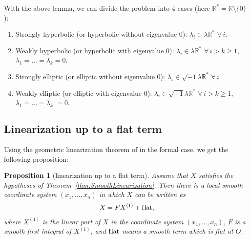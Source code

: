 \documentclass[11pt]{article}
\numberwithin{equation}{section}
\newtheorem{prop}[thm]{Proposition}
 { \theoremstyle{definition}
\newtheorem{Remark}[thm]{Remark} }
\newcommand{\bbR}{\mathbb R}
\begin{document}
With the above lemma, we can divide the problem into 4 cases (here $\bbR^* = \bbR \setminus \{0\}$):
\begin{enumerate}\itemsep=0pt
\item[I.] Strongly hyperbolic (or hyperbolic without eigenvalue 0): $\lambda_i \in \lambda\bbR^*$ $\forall\, i$.
\item[II.] Weakly hyperbolic (or hyperbolic with eigenvalue 0): $\lambda_i \in \lambda\bbR^* $ $\forall\, i > k \geq 1$,
$\lambda_1 = \dots = \lambda_k = 0$.
\item[III.] Strongly elliptic (or elliptic without eigenvalue 0): $\lambda_i \in \sqrt{-1}\lambda\bbR^*$ $\forall\, i$.
\item[IV.] Weakly elliptic (or elliptic with eigenvalue 0): $\lambda_i \in \sqrt{-1}\lambda\bbR^*$ $\forall\, i > k \geq 1$,
$\lambda_1 = \dots = \lambda_k$ $= 0$.
\end{enumerate}

\subsection{Linearization up to a f\/lat term} Using the geometric linearization theorem of \cite{Zung-Nondegenerate2015}
in the formal case, we get the following proposition:

\begin{prop}[linearization up to a f\/lat term] \label{prop:LinearizationUpToFlat}
 Assume that $X$ satisfies the hypotheses of Theorem~{\rm \ref{thm:SmoothLinearization}}. Then there is a local smooth
coordinate system $(x_1,\dots,x_n)$ in which $X$ can be written as
\begin{gather*}
X = FX^{(1)} + \text{\rm f\/lat},
\end{gather*}
where $X^{(1)}$ is the linear part of $X$ in the coordinate system $(x_1,\dots,x_n)$,
$F$ is a smooth first integral of $X^{(1)}$, and $\text{\rm f\/lat}$ means a smooth term which is flat at $O$.
\end{prop}
\end{document}
